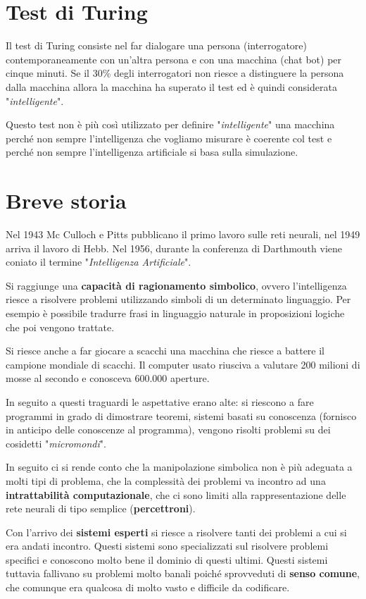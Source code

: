 \section{Test di Turing}
Il test di Turing consiste nel far dialogare una persona (interrogatore)
contemporaneamente con un'altra persona e con una macchina (chat bot) per cinque
minuti. Se il 30\% degli interrogatori non riesce a distinguere la persona dalla
macchina allora la macchina ha superato il test ed \`e quindi considerata
"\emph{intelligente}".

Questo test non \`e pi\`u cos\`i utilizzato per definire "\emph{intelligente}" una
macchina perch\'e non sempre l'intelligenza che vogliamo misurare \`e coerente col
test e perch\'e non sempre l'intelligenza artificiale si basa sulla simulazione.

\section{Breve storia}
Nel 1943 Mc Culloch e Pitts pubblicano il primo lavoro sulle reti neurali, nel 1949 arriva
il lavoro di Hebb. Nel 1956, durante la conferenza di Darthmouth viene coniato il termine
"\emph{Intelligenza Artificiale}".

Si raggiunge una \textbf{capacit\`a di ragionamento simbolico}, ovvero l'intelligenza riesce a
risolvere problemi utilizzando simboli di un determinato linguaggio. Per esempio \`e possibile
tradurre frasi in linguaggio naturale in proposizioni logiche che poi vengono trattate.

Si riesce anche a far giocare a scacchi una macchina che riesce a battere il campione mondiale
di scacchi. Il computer usato riusciva a valutare 200 milioni di mosse al secondo e conosceva
600.000 aperture.

In seguito a questi traguardi le aspettative erano alte: si riescono a fare programmi in grado
di dimostrare teoremi, sistemi basati su conoscenza (fornisco in anticipo delle conoscenze al
programma), vengono risolti problemi su dei cosidetti "\emph{micromondi}".

In seguito ci si rende conto che la manipolazione simbolica non \`e pi\`u adeguata a molti tipi
di problema, che la complessit\`a dei problemi va incontro ad una
\textbf{intrattabilit\`a computazionale}, che ci sono limiti alla rappresentazione delle rete
neurali di tipo semplice (\textbf{percettroni}).

Con l'arrivo dei \textbf{sistemi esperti} si riesce a risolvere tanti dei problemi a cui si era
andati incontro. Questi sistemi sono specializzati sul risolvere problemi specifici e conoscono
molto bene il dominio di questi ultimi. Questi sistemi tuttavia fallivano su problemi molto
banali poich\'e sprovveduti di \textbf{senso comune}, che comunque era qualcosa di molto
vasto e difficile da codificare.

